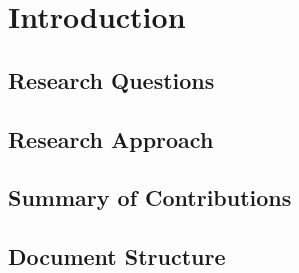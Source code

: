\chapter{Introduction}

\section{Research Questions}

\section{Research Approach}

\section{Summary of Contributions}

\section{Document Structure}